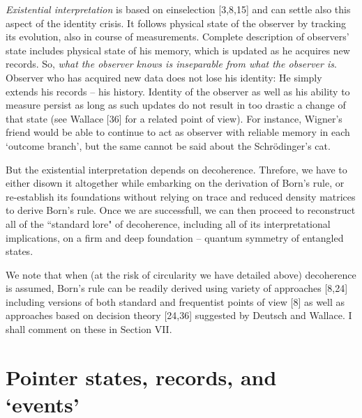 \documentclass[aps,twocolumn,pra,epsfig]{revtex4}
\begin{document}
{\it Existential interpretation} is based on einselection [3,8,15] and can
settle also this aspect of the identity crisis. It follows physical state
of the observer by tracking its evolution, also in course of measurements.
Complete description of observers' state includes physical state of his memory,
which is updated as he acquires new records. So, {\it what the observer
knows is inseparable from what the observer is}. Observer who has acquired new
data does not lose his identity:  He simply extends his records -- his
history. Identity of the observer as well as his ability to measure persist
as long as such updates do not result in too drastic a change of that state
(see Wallace [36] for a related point of view).  For instance, Wigner's friend
would be able to continue to act as observer with reliable memory in each
`outcome branch', but the same cannot be said about the Schr\"odinger's cat.

But the existential interpretation depends on decoherence. Threfore, we have to
either disown it altogether while embarking on the derivation of Born's rule, 
or re-establish its foundations without relying on trace and reduced density 
matrices to derive Born's rule. Once we are successfull, we can then proceed
to reconstruct all of the ``standard lore" of decoherence, including all of its 
interpretational implications, on a firm and deep foundation -- quantum
symmetry of entangled states.

We note that when (at the risk of circularity we have detailed above)
decoherence is assumed, Born's rule can be readily derived using variety
of approaches [8,24] including versions of both standard and frequentist
points of view [8] as well as approaches based on decision theory [24,36]
suggested by Deutsch and Wallace. I shall comment on these in Section VII.

\section{Pointer states, records, and `events'}
\end{document}
